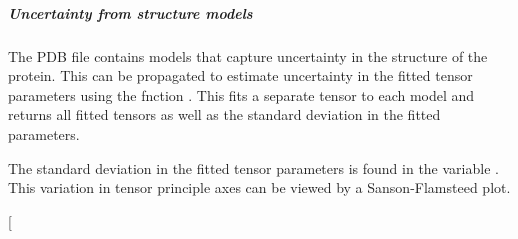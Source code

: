\documentclass[a4paper,10pt,english,openany,oneside]{sphinxmanual}
\begin{document}
\subparagraph{Uncertainty from structure models}
\label{\detokenize{examples/pcs_fit_uncertainty:uncertainty-from-structure-models}}
The PDB file contains models that capture uncertainty in the structure of the protein. This can be propagated to estimate uncertainty in the fitted tensor parameters using the fnction . This fits a separate tensor to each model and returns all fitted tensors as well as the standard deviation in the fitted parameters.

%
\begin{sphinxVerbatim}[commandchars=\\\{\}]
\PYG{p}{[}\PYG{p}{]} \PYG{p}{[}\PYG{p}{]}   
	\PYG{p}{[}\PYG{p}{]} \PYG{p}{[}\PYG{p}{]}

\end{sphinxVerbatim}

The standard deviation in the fitted tensor parameters is found in the variable . This variation in tensor principle axes can be viewed by a Sanson-Flamsteed plot.

 {[}\sphinxcode{\sphinxupquote{error\_tensor\_models.txt}}{]}
\end{document}
